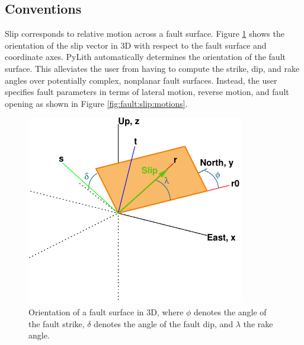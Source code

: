 \subsection{Conventions}

Slip corresponds to relative motion across a fault surface. Figure
\ref{fig:fault:orientation} shows the orientation of the slip vector
in 3D with respect to the fault surface and coordinate axes. PyLith
automatically determines the orientation of the fault surface. This
alleviates the user from having to compute the strike, dip, and rake
angles over potentially complex, nonplanar fault surfaces. Instead,
the user specifies fault parameters in terms of lateral motion, reverse
motion, and fault opening as shown in Figure \ref{fig:fault:slip:motions}.

\noindent \begin{center}
\begin{figure}[H]
\begin{centering}
\includegraphics{boundaryconditions/figs/faultOrientation}
\par\end{centering}

\caption{Orientation of a fault surface in 3D, where $\phi$ denotes the angle
of the fault strike, $\delta$ denotes the angle of the fault dip,
and $\lambda$ the rake angle. \label{fig:fault:orientation} }
\end{figure}

\par\end{center}

